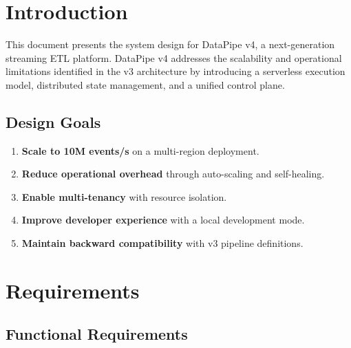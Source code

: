 \documentclass[
    language=english,
    doctype=technical-report,
    institution=none,
    titlestyle=book,
    oneside,
]{../../omnilatex}
\begin{document}
\maketitle

\tableofcontents

\chapter{Introduction}
\label{sec:introduction}

This document presents the system design for DataPipe v4, a next-generation
streaming ETL platform. DataPipe v4 addresses the scalability and
operational limitations identified in the v3 architecture by introducing a
serverless execution model, distributed state management, and a unified
control plane.

\section{Design Goals}

\begin{enumerate}
    \item \textbf{Scale to 10M events/s} on a multi-region deployment.
    \item \textbf{Reduce operational overhead} through auto-scaling and
        self-healing.
    \item \textbf{Enable multi-tenancy} with resource isolation.
    \item \textbf{Improve developer experience} with a local development
        mode.
    \item \textbf{Maintain backward compatibility} with v3 pipeline
        definitions.
\end{enumerate}

\chapter{Requirements}
\label{sec:requirements}

\section{Functional Requirements}
\end{document}
